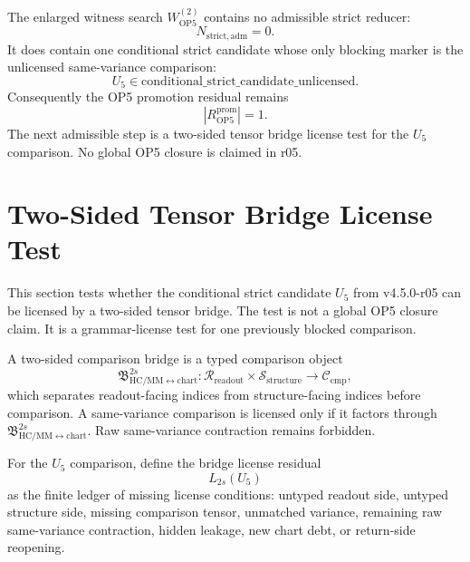 \begin{theorem}
The enlarged witness search \(W_{\mathrm{OP5}}^{(2)}\) contains no admissible
strict reducer:
\[
    N_{\mathrm{strict,adm}}=0.
\]
It does contain one conditional strict candidate whose only blocking marker is
the unlicensed same-variance comparison:
\[
    U_5 \in \mathrm{conditional\_strict\_candidate\_unlicensed}.
\]
Consequently the OP5 promotion residual remains
\[
    |R_{\mathrm{OP5}}^{\mathrm{prom}}|=1.
\]
The next admissible step is a two-sided tensor bridge license test for the
\(U_5\) comparison.  No global OP5 closure is claimed in r05.
\end{theorem}



\section{Two-Sided Tensor Bridge License Test}
\label{sec:v450-r06-two-sided-tensor-bridge-license-test}

This section tests whether the conditional strict candidate \(U_5\) from
v4.5.0-r05 can be licensed by a two-sided tensor bridge.  The test is not a
global OP5 closure claim.  It is a grammar-license test for one previously
blocked comparison.

\begin{definition}
A two-sided comparison bridge is a typed comparison object
\[
    \mathfrak B_{\mathrm{HC/MM}\leftrightarrow\mathrm{chart}}^{2s}
    :
    \mathcal R_{\mathrm{readout}}
    \times
    \mathcal S_{\mathrm{structure}}
    \longrightarrow
    \mathcal C_{\mathrm{cmp}},
\]
which separates readout-facing indices from structure-facing indices before
comparison.  A same-variance comparison is licensed only if it factors through
\(\mathfrak B_{\mathrm{HC/MM}\leftrightarrow\mathrm{chart}}^{2s}\).  Raw
same-variance contraction remains forbidden.
\end{definition}

\begin{definition}
For the \(U_5\) comparison, define the bridge license residual
\[
    L_{2s}(U_5)
\]
as the finite ledger of missing license conditions: untyped readout side,
untyped structure side, missing comparison tensor, unmatched variance,
remaining raw same-variance contraction, hidden leakage, new chart debt, or
return-side reopening.
\end{definition}

